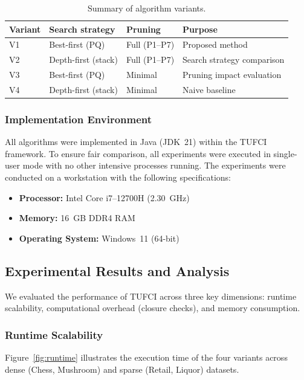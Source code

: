 \documentclass[10pt,letterpaper]{article}
\begin{document}
\begin{table}[H]
\centering
\caption{Summary of algorithm variants.}
\label{tab:variants}
\begin{tabular}{llll}
\hline
\textbf{Variant} & \textbf{Search strategy} & \textbf{Pruning} & \textbf{Purpose} \\
\hline
V1 & Best-first (PQ) & Full (P1--P7) & Proposed method \\
V2 & Depth-first (stack) & Full (P1--P7) & Search strategy comparison \\
V3 & Best-first (PQ) & Minimal & Pruning impact evaluation \\
V4 & Depth-first (stack) & Minimal & Naive baseline \\
\hline
\end{tabular}
\end{table}

\subsubsection*{Implementation Environment}

All algorithms were implemented in Java (JDK~21) within the TUFCI framework. To ensure fair comparison, all experiments were executed in single-user mode with no other intensive processes running. The experiments were conducted on a workstation with the following specifications:

\begin{itemize}
    \item \textbf{Processor:} Intel Core i7--12700H (2.30~GHz)
    \item \textbf{Memory:} 16~GB DDR4 RAM
    \item \textbf{Operating System:} Windows~11 (64-bit)
\end{itemize}

\subsection*{Experimental Results and Analysis}

We evaluated the performance of TUFCI across three key dimensions: runtime scalability, computational overhead (closure checks), and memory consumption.

\subsubsection*{Runtime Scalability}
Figure~\ref{fig:runtime} illustrates the execution time of the four variants across dense (Chess, Mushroom) and sparse (Retail, Liquor) datasets.
\end{document}
